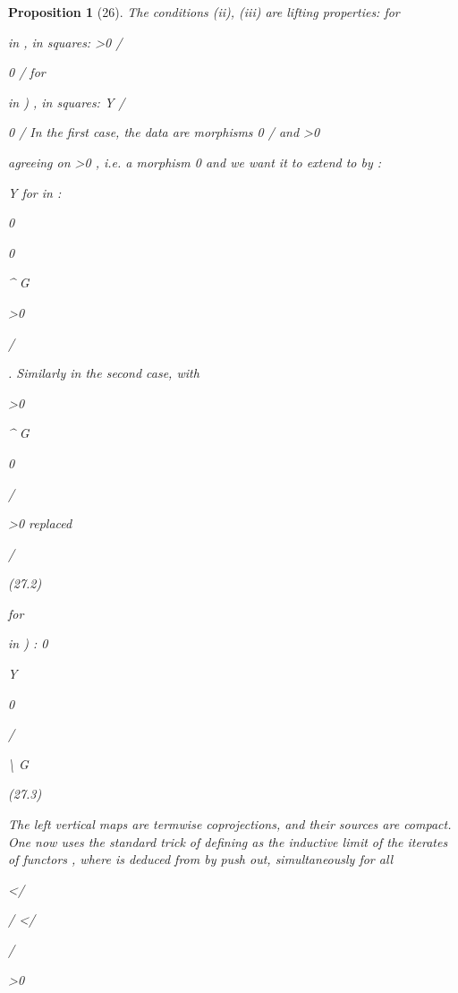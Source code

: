 \documentclass[11pt,a4paper]{article}
\theoremstyle{plain}
\newtheorem{proposition}[theorem]{Proposition}
\theoremstyle{definition}
\begin{document}
\begin{proposition}[26]
The conditions (ii), (iii) are lifting properties:
for

 in  , in squares:
>0    / 







0    /
for

 in ) , in squares:
Y     / 







0    /
In the first case, the data are morphisms 0
/  and >0

agreeing on >0
, i.e. a morphism
0
and we want it to extend to
by  :

Y
for  in  :

0


0


\textasciicircum{} G

>0

 / 

. Similarly in the second case, with

 >0


\textasciicircum{} G

0



/ 

>0 replaced

  / 






(27.2)


for


 in ) :
0



 Y 


0

  / 




\textbackslash{}  G






(27.3)



The left vertical maps are termwise coprojections, and their sources are compact.
One now uses the standard trick of defining
as the inductive limit of the
iterates of functors
, where
is deduced from
by push out,
simultaneously for all

</ 

/ 
</

/

>0


\end{proposition}
\end{document}
